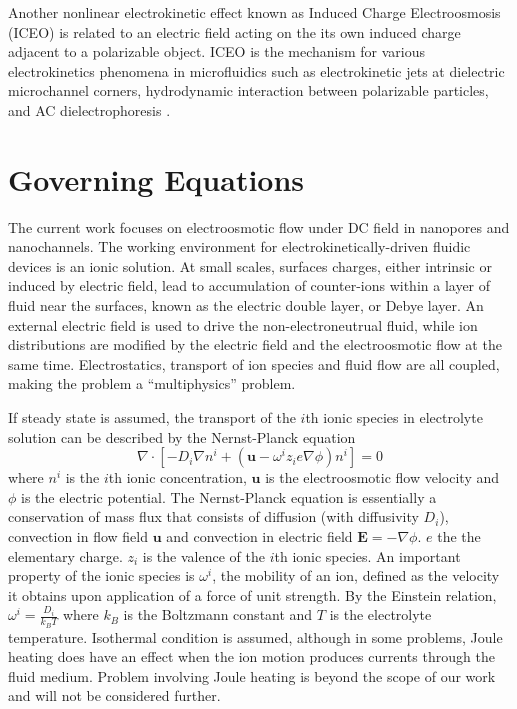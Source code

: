 Another nonlinear electrokinetic effect known as Induced Charge Electroosmosis (ICEO) \cite{murtsovkin96,Squires2004} is related to an electric field acting on the its own induced charge adjacent to a polarizable object. ICEO is the mechanism for various electrokinetics phenomena in microfluidics such as electrokinetic jets at dielectric microchannel corners, hydrodynamic interaction between polarizable particles, and AC dielectrophoresis \cite{bazant2004induced,levitan2005experimental,basuray2007induced,bazant2009towards,schnitzer2012induced,schnitzer2014strong}. 

\section{Governing Equations}
The current work focuses on electroosmotic flow under DC field in nanopores and nanochannels.  The working environment for electrokinetically-driven fluidic devices is an ionic solution. At small scales, surfaces charges, either intrinsic or induced by electric field, lead to accumulation of counter-ions within a layer of fluid near the surfaces, known as the electric double layer, or Debye layer. An external electric field is used to drive the non-electroneutrual fluid, while ion distributions are modified by the electric field and the electroosmotic flow at the same time. Electrostatics, transport of ion species and fluid flow are all coupled, making the problem a ``multiphysics'' problem.

If steady state is assumed, the transport of the $i$th ionic species in electrolyte solution can be described by the Nernst-Planck equation \cite{landau1981course}
\begin{equation}
\nabla \cdot \left[ -D_i \nabla n^i  + \left(\mathbf{u} - \omega^i z_i e\nabla\phi \right)n^i  \right] = 0
\label{eq:nernst-planck}
\end{equation}
where $n^i$ is the $i$th ionic concentration, $\mathbf{u}$ is the electroosmotic flow velocity and $\phi$ is the electric potential. The Nernst-Planck equation is essentially a conservation of mass flux that consists of diffusion (with diffusivity $D_i$), convection in flow field $\mathbf{u}$ and convection in electric field $\mathbf{E} = -\nabla \phi$. $e$ the the elementary charge. $z_i$ is the valence of the $i$th ionic species. An important property of the ionic species is $\omega^i$, the mobility of an ion, defined as the velocity it obtains upon application of a force of unit strength.  By the Einstein relation, $\omega^i=\frac{D_i}{k_B T}$ where $k_B$ is the Boltzmann constant and $T$ is the electrolyte temperature. Isothermal condition is assumed, although in some problems, Joule heating does have an effect when the ion motion produces currents through the fluid medium\cite{sridharan2011joule}. Problem involving Joule heating is beyond the scope of our work and will not be considered further.

